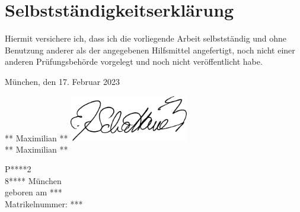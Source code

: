 \chapter*{Selbstständigkeitserklärung}
Hiermit versichere ich, dass ich die vorliegende Arbeit selbstständig und ohne Benutzung anderer als der angegebenen Hilfsmittel angefertigt, noch nicht einer anderen Prüfungsbehörde vorgelegt und noch nicht veröffentlicht habe.

\vspace{5cm}
München, den 17. Februar 2023

\ifprintversion
    \vspace{3cm}
    ** Maximilian **
\else
    \vspace{1cm}
    \includegraphics[height=2cm]{img/full_a4.png}\\
    ** Maximilian **
\fi

\ifprintversion
P****2 \\
8**** München \\
geboren am *** \\
Matrikelnummer: ***
\fi
